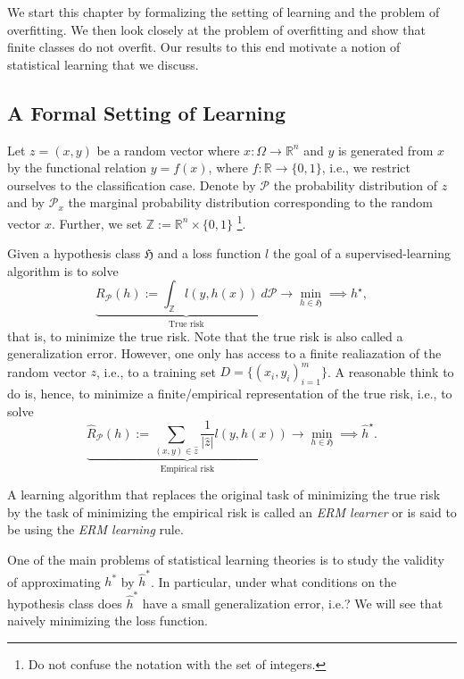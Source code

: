 We start this chapter by formalizing the setting of learning and the problem of
overfitting. We then look closely at the problem of overfitting and show that
finite classes do not overfit. Our results to this end motivate a notion of
statistical learning that we discuss.

\subsection{A Formal Setting of Learning}
Let $z = (x, y)$ be a random vector where $x: \Omega \to \mathbb{R}^n$ and $y$
is generated from $x$ by the functional relation $y=f(x)$, where $f: \mathbb{R}
\to \{0,1\}$, i.e., we restrict ourselves to the classification case. Denote by
$\mathcal{P}$ the probability distribution of $z$ and by $\mathcal{P}_x$ the
marginal probability distribution corresponding to the random vector $x$.
Further, we set $\mathbb{Z} := \mathbb{R}^n \times \{0,1\}$ \footnote{Do not
confuse the notation with the set of integers.}.

Given a hypothesis class $\mathfrak{H}$  and a loss function $l$ the goal of a supervised-learning
algorithm is to solve 
\begin{equation*}
    \underbrace{R_{\mathcal{P}}(h) := \int_{\mathbb{Z}} l(y, h(x)) \ d \mathcal{P}}_{\text{True risk}} \longrightarrow \min_{h \in \mathfrak{H}} \implies h^\star, 
\end{equation*}
that is, to minimize the true risk. Note that the true risk is also called a
generalization error. However, one only has access to a finite
realiazation of the random vector $z$, i.e., to a training set $D=\{(x_i,
y_i)_{i=1}^m\}$. A reasonable think to do is, hence, to minimize a
finite/empirical representation of the true risk, i.e., to solve
\begin{equation*}
    \underbrace{\hat{R}_{\mathcal{P}} (h) := \sum_{(x,y) \in \hat{z}} \frac{1}{|\hat{z}|}l(y, h(x)) }_{\text{Empirical risk}} \longrightarrow \min_{h \in \mathfrak{H}} \implies \hat{h}^\star.
\end{equation*}

A learning algorithm that replaces the original task of minimizing the true risk
by the task of minimizing the empirical risk is called an \emph{ERM learner} or
is said to be using the \emph{ERM learning} rule. 

One of the main problems of statistical learning theories is to study the
validity of approximating $h^*$ by $\hat{h}^*$. In particular, under what
conditions on the hypothesis class does $\hat{h}^*$ have a small generalization error,
i.e.? We
will see that naively minimizing the loss function. 

